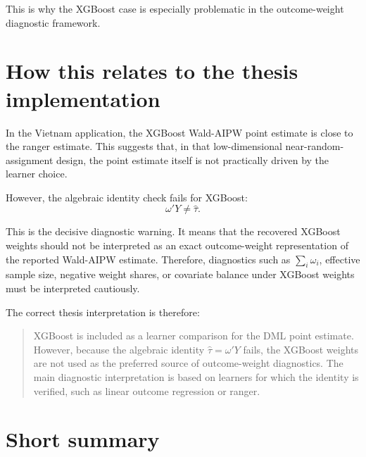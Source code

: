 \documentclass[11pt,a4paper]{article}
\begin{document}
This is why the XGBoost case is especially problematic in the outcome-weight
diagnostic framework.

\section{How this relates to the thesis implementation}

In the Vietnam application, the XGBoost Wald-AIPW point estimate is close to the
ranger estimate. This suggests that, in that low-dimensional near-random-assignment
design, the point estimate itself is not practically driven by the learner choice.

However, the algebraic identity check fails for XGBoost:
\begin{equation}
    \omega'Y \neq \hat\tau.
\end{equation}

This is the decisive diagnostic warning. It means that the recovered XGBoost
weights should not be interpreted as an exact outcome-weight representation of
the reported Wald-AIPW estimate. Therefore, diagnostics such as
\(\sum_i\omega_i\), effective sample size, negative weight shares, or covariate
balance under XGBoost weights must be interpreted cautiously.

The correct thesis interpretation is therefore:

\begin{quote}
XGBoost is included as a learner comparison for the DML point estimate. However,
because the algebraic identity \(\hat\tau=\omega'Y\) fails, the XGBoost weights are
not used as the preferred source of outcome-weight diagnostics. The main
diagnostic interpretation is based on learners for which the identity is verified,
such as linear outcome regression or ranger.
\end{quote}

\section{Short summary}
\end{document}
